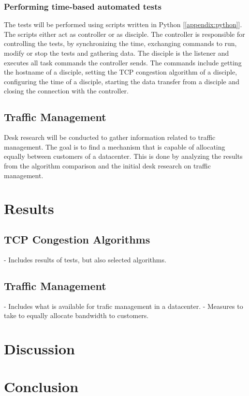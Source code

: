 \documentclass{article}
\begin{document}
		\subsubsection{Performing time-based automated tests}
		The tests will be performed using scripts written in Python [\ref{appendix:python}]. The scripts either act as controller or as disciple. The controller is responsible for controlling the tests, by synchronizing the time, exchanging commands to run, modify or stop the tests and gathering data. The disciple is the listener and executes all task commands the controller sends. The commands include getting the hostname of a disciple, setting the TCP congestion algorithm of a disciple, configuring the time of a disciple, starting the data transfer from a disciple and closing the connection with the controller.

	\subsection{Traffic Management}
	Desk research will be conducted to gather information related to traffic management. The goal is to find a mechanism that is capable of allocating equally between customers of a datacenter. This is done by analyzing the results from the algorithm comparison and the initial desk research on traffic management. 

\section{Results}
	\subsection{TCP Congestion Algorithms}
	- Includes results of tests, but also selected algorithms.
	
	\subsection{Traffic Management}
	- Includes what is available for trafic management in a datacenter.
	- Measures to take to equally allocate bandwidth to customers.

\section{Discussion}


\section{Conclusion}
\end{document}
